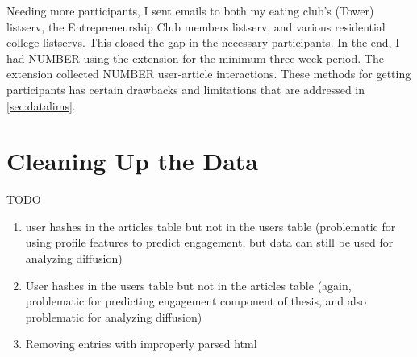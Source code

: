Needing more participants, I sent emails to both my eating club's (Tower) listserv, the Entrepreneurship Club members listserv, and various residential college listservs.  This closed the gap in the necessary participants.  In the end, I had NUMBER using the extension for the minimum three-week period.  The extension collected NUMBER user-article interactions.  These methods for getting participants has certain drawbacks and limitations that are addressed in \ref{sec:datalims}.

\section{Cleaning Up the Data} \label{cleanup}
TODO
\begin{enumerate}
	\item user hashes in the articles table but not in the users table (problematic for using profile features to predict engagement, but data can still be used for analyzing diffusion)
	\item User hashes in the users table but not in the articles table (again, problematic for predicting engagement component of thesis, and also problematic for analyzing diffusion)
	\item Removing entries with improperly parsed html
\end{enumerate}



















